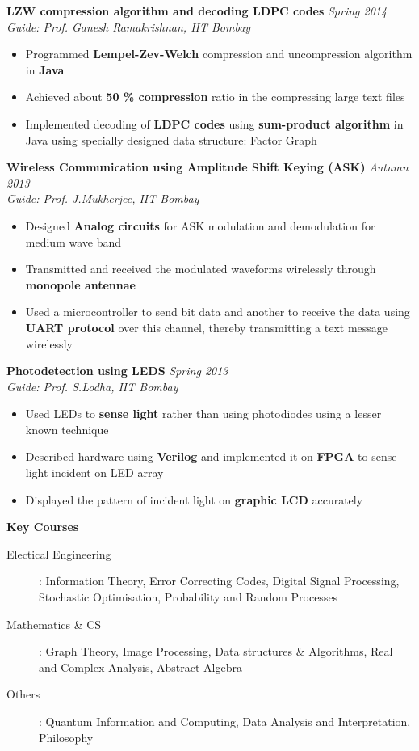 \documentclass[a4paper,10pt]{article}
\newcommand{\resheading}[1]{
	{\large \colorbox{mygrey}{\begin{minipage}{\textwidth}{\textbf{#1 \vphantom{p\^{E}}}}\end{minipage}}}
}
\newcommand{\ressubheadingWithGuide}[3]{%

	\textbf{#1} \hfill \textit{#2}\null\\
	\textit{\small #3} %
	\vspace{-4pt}
}
\begin{document}
    		\ressubheadingWithGuide{LZW compression algorithm and decoding LDPC codes}{\textit{Spring 2014}}{Guide: Prof. Ganesh Ramakrishnan, IIT Bombay}
            	\begin{itemize}\itemsep -1pt
            	\item Programmed \textbf{Lempel-Zev-Welch} compression and uncompression algorithm in \textbf{Java}
				\item Achieved about \textbf{50 \% compression} ratio in the compressing large text files
				\item Implemented decoding of \textbf{LDPC codes} using \textbf{sum-product algorithm} in Java using specially designed data structure: Factor Graph
            	\end{itemize}



        	\ressubheadingWithGuide{Wireless Communication using Amplitude Shift Keying (ASK)}{\textit{Autumn 2013}}{Guide: Prof. J.Mukherjee, IIT Bombay}
            	\begin{itemize}\itemsep -1pt
                \item Designed \textbf{Analog circuits} for ASK modulation and demodulation for medium wave band
                \item Transmitted and received the modulated waveforms wirelessly through \textbf{monopole antennae}
                \item Used a microcontroller to send bit data and another to receive the data using \textbf{UART protocol} over this channel, thereby transmitting a text message wirelessly
                \end{itemize}

        	\ressubheadingWithGuide{Photodetection using LEDS}{\textit{Spring 2013}}{Guide: Prof. S.Lodha, IIT Bombay}
        		\begin{itemize}\itemsep -1pt
        		\item Used LEDs to \textbf{sense light} rather than using photodiodes using a lesser known technique
				\item Described hardware using \textbf{Verilog} and implemented it on \textbf{FPGA} to sense light incident on LED array
				\item Displayed the pattern of incident light on \textbf{graphic LCD} accurately
				\end{itemize}



\resheading{Key Courses}
\begin{description}
\item[Electical Engineering]:  Information Theory, Error Correcting Codes, Digital Signal Processing, Stochastic Optimisation, Probability and Random Processes
\item[Mathematics \& CS]: Graph Theory, Image Processing, Data structures \& Algorithms, Real and Complex Analysis, Abstract Algebra
\item[Others]: Quantum Information and Computing, Data Analysis and Interpretation, Philosophy
\end{description}
\end{document}
